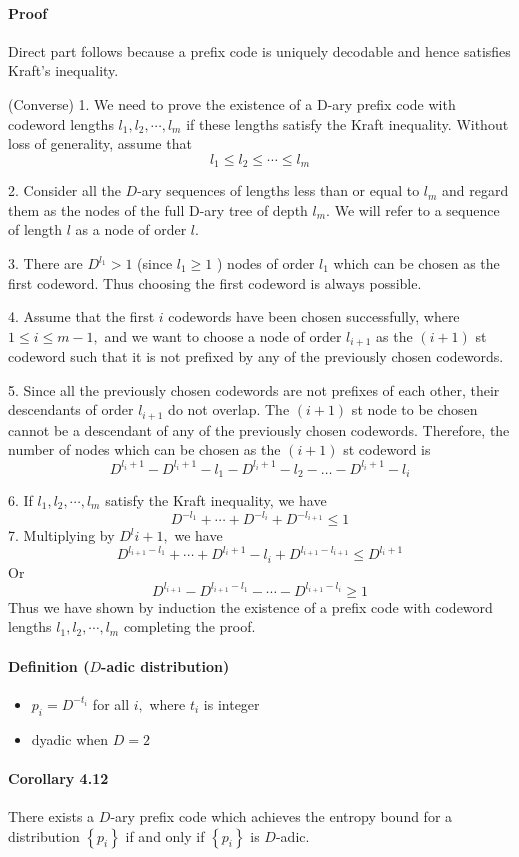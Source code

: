 \documentclass[8pt]{article}
\begin{document}
\paragraph{Proof}
Direct part follows because a prefix code is uniquely decodable and hence satisfies Kraft's inequality.

(Converse)
1. We need to prove the existence of a D-ary prefix code with codeword lengths $l_{1}, l_{2}, \cdots, l_{m}$ if these lengths satisfy the Kraft inequality. Without loss of generality, assume that
$$
l_{1} \leq l_{2} \leq \cdots \leq l_{m}
$$

2. Consider all the $D$-ary sequences of lengths less than or equal to $l_{m}$ and regard them as the nodes of the full D-ary tree of depth $l_{m}$. We will refer to a sequence of length $l$ as a node of order $l$.

3. There are $D^{l_1}>1$ (since $l_{1} \geq 1$ ) nodes of order $l_{1}$ which can be chosen as the first codeword. Thus choosing the first codeword is always possible.

4. Assume that the first $i$ codewords have been chosen successfully, where $1 \leq i \leq m-1,$ and we want to choose a node of order $l_{i+1}$ as the $(i+1)$ st codeword such that it is not prefixed by any of the previously chosen codewords.

5. Since all the previously chosen codewords are not prefixes of each other, their descendants of order $l_{i+1}$ do not overlap. The $(i+1)$ st node to be chosen cannot be a descendant of any of the previously chosen codewords. Therefore, the number of nodes which can be chosen as the $(i+1)$ st codeword is
$$
D^{l_{i}+1}-D^{l_{i}+1}-l_{1}-D^{l_{i}+1}-l_{2}-\ldots-D^{l_{i}+1}-l_{i}
$$

6. If $l_{1}, l_{2}, \cdots, l_{m}$ satisfy the Kraft inequality, we have
$$
D^{-l_{1}}+\cdots+D^{-l_{i}}+D^{-l_{i+1}} \leq 1
$$
7. Multiplying by $D^{l} i+1,$ we have
$$
D^{l_{i+1}-l_{1}}+\cdots+D^{l_{i}+1}-l_{i}+D^{l_{i+1}-l_{i+1}} \leq D^{l_{i}+1}
$$
Or
$$
D^{l_{i+1}}-D^{l_{i+1} -l_1}-\cdots-D^{l_{i+1} -l_i} \geq 1
$$
Thus we have shown by induction the existence of a prefix code with codeword lengths $l_{1}, l_{2}, \cdots, l_{m}$ completing the proof.

\paragraph{Definition ($D$-adic distribution)}
\begin{itemize}
    \item $p_{i}=D^{-t_{i}}$ for all $i,$ where $t_{i}$ is integer
    \item dyadic when $D=2$
\end{itemize}
\begin{tcolorbox}
\paragraph{Corollary 4.12} There exists a $D$-ary prefix code which achieves the entropy bound for a distribution $\left\{p_{i}\right\}$ if and only if $\left\{p_{i}\right\}$ is $D$-adic.
\end{tcolorbox}
\end{document}
